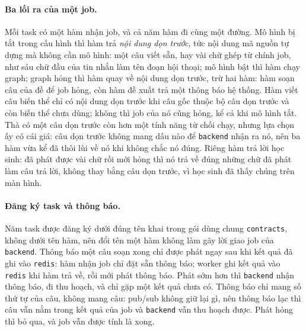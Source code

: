 \paragraph{Ba lối ra của một job.} Mỗi task có một hàm nhận job, và cả năm hàm đi cùng một đường. Mô
hình bị tắt trong cấu hình thì hàm trả \emph{nội dung dọn trước}, tức nội dung mã nguồn tự dựng mà
không cần mô hình: một câu viết sẵn, hay vài chữ ghép từ chính job, như sáu chữ đầu của tin nhắn làm
tên đoạn hội thoại; mô hình bật thì hàm chạy graph; graph hỏng thì hàm quay về nội dung dọn trước,
trừ hai hàm: hàm soạn câu của đề để job hỏng, còn hàm đề xuất trả một thông báo hệ thống. Hàm viết
câu biến thể chỉ có nội dung dọn trước khi câu gốc thuộc bộ câu dọn trước và còn biến thể chưa dùng;
không thì job của nó cũng hỏng, kể cả khi mô hình tắt.
Thà có một câu dọn trước còn hơn một tính năng từ chối chạy, nhưng lựa chọn ấy có cái giá: câu dọn
trước không mang dấu nào để \texttt{backend} nhận ra nó, nên ba hàm vừa kể đã thôi lùi về nó khi
không chắc nó đúng. Riêng hàm trả lời học sinh: đã phát được vài chữ rồi mới hỏng thì nó
trả về đúng những chữ đã phát làm câu trả lời, không thay bằng câu dọn trước, vì học sinh đã thấy
chúng trên màn hình.

\paragraph{Đăng ký task và thông báo.} Năm task được đăng ký dưới đúng tên khai trong gói dùng chung
\texttt{contracts}, không dưới tên hàm, nên đổi tên một hàm không làm gãy lời giao job của
\texttt{backend}. Thông báo một câu soạn xong chỉ được phát ngay sau khi kết quả đã ghi vào
\texttt{redis}: hàm nhận job chỉ đặt sẵn thông báo; worker ghi kết quả vào \texttt{redis} khi hàm
trả về, rồi mới phát thông báo. Phát sớm hơn thì \texttt{backend} nhận thông báo, đi thu hoạch, và
chỉ gặp một kết quả chưa có. Thông báo chỉ mang số thứ tự của câu, không mang câu: pub/sub không giữ
lại gì, nên thông báo lạc thì câu vẫn nằm trong kết quả của job và \texttt{backend} vẫn thu hoạch
được. Phát hỏng thì bỏ qua, và job vẫn được tính là xong.

